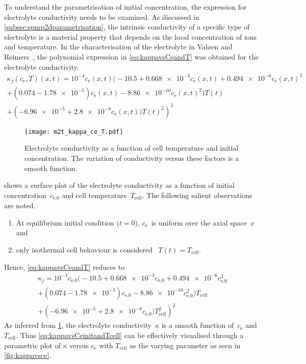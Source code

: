 To  understand  the parametrisation  of  initial  concentration, the  expression
for   electrolyte   conductivity   needs    to   be   examined.   As   discussed
in \cref{subsec:spmp2dparametrisation}, the intrinsic conductivity of a specific
type  of  electrolyte  is  a  material   property  that  depends  on  the  local
concentration of  ions and  temperature. In the characterisation of the
electrolyte in Valøen and  Reimers~\cite{Valoen2005}, the polynomial expression
in \cref{eq:kappavsCeandT} was obtained for the electrolyte conductivity.
\begin{multline}\label{eq:kappavsCeandT}
    \kappa_j(c_\text{e},T)(x,t) =  10^{-4} c_\text{e}(x,t) \bigl(-10.5 + \num{0.668e-3} c_\text{e}(x,t) + \num{0.494e-6}  c_\text{e}{(x,t)}^2\\
    + (0.074 - \num{1.78e-5}) c_\text{e}(x,t) - \num{8.86e-10} c_\text{e}{(x,t)}^2 \bigr)T(t)\\
	+ \left(\num{-6.96e-5} + \num{2.8e-8} c_\text{e}{(x,t)})T(t)^2\right)^2
\end{multline}

\begin{figure}[!htbp]
    \centering
    \texttt{[image: m2t\_kappa\_ce\_T.pdf]}
    \caption[Surface plot of electrolyte conductivity]
    {Electrolyte conductivity as a function of cell temperature and initial
        concentration. The variation of conductivity versus these factors is a
    smooth function.}
    \label{fig:kappavsCeandT}
\end{figure}

   shows    a   surface   plot   of    the   electrolyte
conductivity  as a  function  of initial  concentration~$c_\text{e,0}$ and  cell
temperature~$T_\text{cell}$. The following salient observations are noted.
\begin{enumerate}%
    \item At  equilibrium  initial condition ($t=0$), $c_\text{e}$~is uniform over the axial space~$x$ and
    \item only isothermal cell behaviour is considered \ie~${T(t) = T_\text{cell}}$.
\end{enumerate}
Hence, \cref{eq:kappavsCeandT} reduces to
\begin{multline}\label{eq:kappavsCeinitandTcell}
    \kappa_j =  10^{-4} c_\text{e,0} \bigl(-10.5 + \num{0.668e-3} c_\text{e,0} + \num{0.494e-6}  c_\text{e,0}^2\\
        + (0.074 - \num{1.78e-5}) c_\text{e,0} - \num{8.86e-10}
    c_\text{e,0}^2 \bigr)T_\text{cell}\\
	+ \left(\num{-6.96e-5} + \num{2.8e-8} c_\text{e,0})T_\text{cell}^2\right)^2
\end{multline}
As inferred from \cref{fig:kappavsCeandT}, the electrolyte conductivity~$\kappa$
is   a    smooth   function   of~$c_\text{e}$    and~$T_\text{cell}$.   Thus
\cref{eq:kappavsCeinitandTcell}   can  be   effectively  visualised   through  a
parametric plot of $\kappa$ versus  $c_\text{e}$ with $T_\text{cell}$ as the varying
parameter as seen in \cref{fig:kappavsce}.

